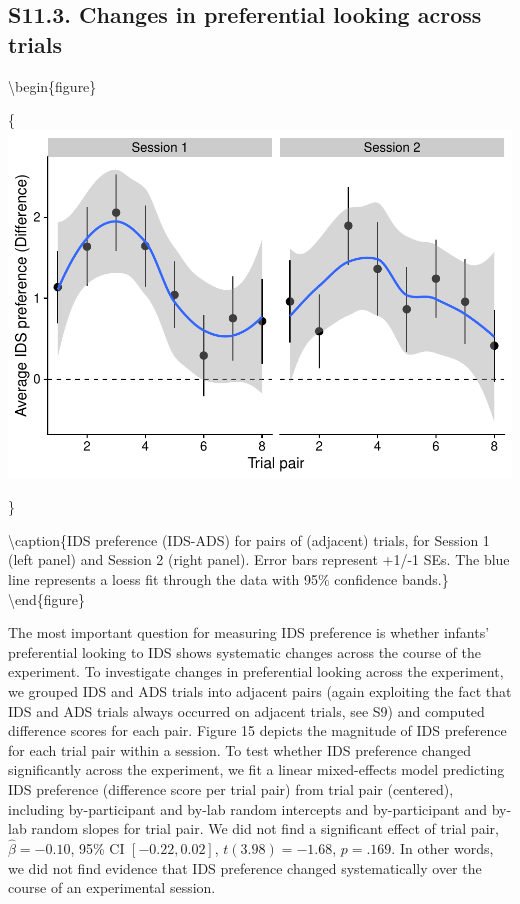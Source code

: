 \documentclass[
  english,
  man, donotrepeattitle,floatsintext]{apa6}
\begin{document}
\hypertarget{s11.3.-changes-in-preferential-looking-across-trials}{%
\subsection{S11.3. Changes in preferential looking across trials}\label{s11.3.-changes-in-preferential-looking-across-trials}}

\textbackslash begin\{figure\}

\{\centering \includegraphics{MB1T_supplement_files/figure-latex/fig15-1}

\}

\textbackslash caption\{IDS preference (IDS-ADS) for pairs of (adjacent) trials, for Session 1 (left panel) and Session 2 (right panel). Error bars represent +1/-1 SEs. The blue line represents a loess fit through the data with 95\% confidence bands.\}\label{fig:fig15}
\textbackslash end\{figure\}

The most important question for measuring IDS preference is whether infants' preferential looking to IDS shows systematic changes across the course of the experiment.
To investigate changes in preferential looking across the experiment, we grouped IDS and ADS trials into adjacent pairs (again exploiting the fact that IDS and ADS trials always occurred on adjacent trials, see S9) and computed difference scores for each pair.
Figure 15 depicts the magnitude of IDS preference for each trial pair within a session.
To test whether IDS preference changed significantly across the experiment, we fit a linear mixed-effects model predicting IDS preference (difference score per trial pair) from trial pair (centered), including by-participant and by-lab random intercepts and by-participant and by-lab random slopes for trial pair.
We did not find a significant effect of trial pair, \(\hat{\beta} = -0.10\), 95\% CI \([-0.22, 0.02]\), \(t(3.98) = -1.68\), \(p = .169\).
In other words, we did not find evidence that IDS preference changed systematically over the course of an experimental session.
\end{document}
